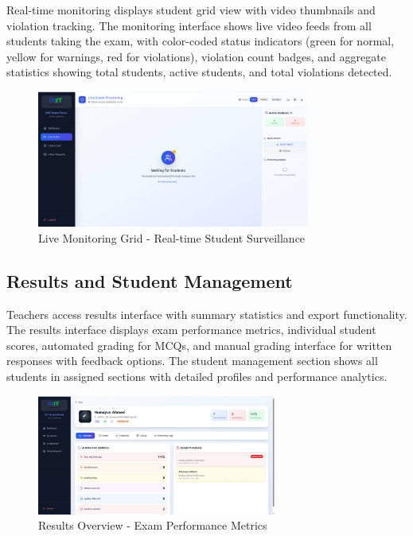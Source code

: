 Real-time monitoring displays student grid view with video thumbnails and violation tracking. The monitoring interface shows live video feeds from all students taking the exam, with color-coded status indicators (green for normal, yellow for warnings, red for violations), violation count badges, and aggregate statistics showing total students, active students, and total violations detected.

\begin{figure}[p]
    \centering
    \includegraphics[width=0.8\textwidth]{Chap4/teacher_live_monitoring_grid.jpg}
    \caption{Live Monitoring Grid - Real-time Student Surveillance}
    \label{fig:teacher_monitor}
\end{figure}

\subsection{Results and Student Management}

Teachers access results interface with summary statistics and export functionality. The results interface displays exam performance metrics, individual student scores, automated grading for MCQs, and manual grading interface for written responses with feedback options. The student management section shows all students in assigned sections with detailed profiles and performance analytics.

\begin{figure}[p]
    \centering
    \includegraphics[width=0.7\textwidth]{Chap4/teacher_results_overview.jpg}
    \caption{Results Overview - Exam Performance Metrics}
    \label{fig:teacher_results}
\end{figure}

